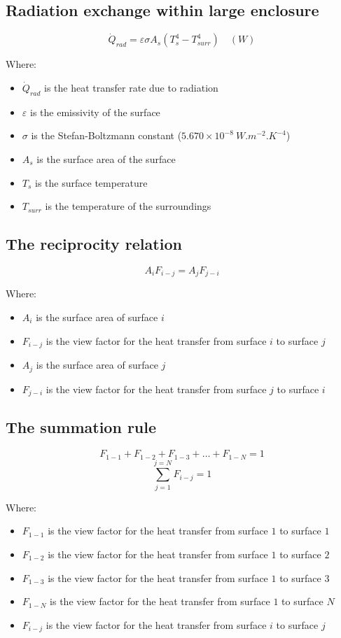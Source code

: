 \documentclass[11pt]{article}
\begin{document}
\subsection{Radiation exchange within large enclosure}
\label{sec:org871b681}
\[\dot{Q}_{rad} = \varepsilon \sigma A_s (T_s^4 - T_{surr}^4) \quad (\unit{W})\]

Where:
\begin{itemize}
\item \(\dot{Q}_{rad}\) is the heat transfer rate due to radiation
\item \(\varepsilon\) is the emissivity of the surface
\item \(\sigma\) is the Stefan-Boltzmann constant (\(5.670 \times 10^{-8} \ \unit{W.m^{-2}.K^{-4}}\))
\item \(A_s\) is the surface area of the surface
\item \(T_s\) is the surface temperature
\item \(T_{surr}\) is the temperature of the surroundings
\end{itemize}

\subsection{The reciprocity relation}
\label{sec:org15602d2}
\[A_i F_{i-j} = A_j F_{j-i}\]

Where:
\begin{itemize}
\item \(A_i\) is the surface area of surface \(i\)
\item \(F_{i-j}\) is the view factor for the heat transfer from surface \(i\) to surface \(j\)
\item \(A_j\) is the surface area of surface \(j\)
\item \(F_{j-i}\) is the view factor for the heat transfer from surface \(j\) to surface \(i\)
\end{itemize}

\subsection{The summation rule}
\label{sec:org666d1af}
\[F_{1-1} + F_{1-2} + F_{1-3} + \ldots + F_{1-N} = 1\]
\[\sum_{j=1}^{j=N} F_{i-j} = 1\]

Where:
\begin{itemize}
\item \(F_{1-1}\) is the view factor for the heat transfer from surface \(1\) to surface \(1\)
\item \(F_{1-2}\) is the view factor for the heat transfer from surface \(1\) to surface \(2\)
\item \(F_{1-3}\) is the view factor for the heat transfer from surface \(1\) to surface \(3\)
\item \(F_{1-N}\) is the view factor for the heat transfer from surface \(1\) to surface \(N\)
\item \(F_{i-j}\) is the view factor for the heat transfer from surface \(i\) to surface \(j\)
\end{itemize}
\end{document}
